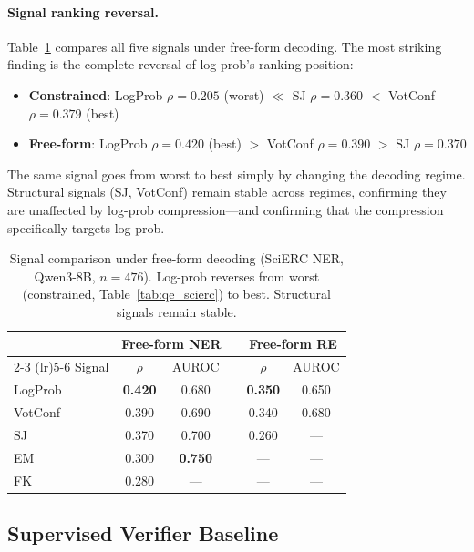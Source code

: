 \documentclass[11pt,a4paper]{article}
\newcommand{\bmark}[1]{\textbf{#1}}
\begin{document}
\paragraph{Signal ranking reversal.}
Table~\ref{tab:freeform_signals} compares all five signals under free-form decoding. The most striking finding is the complete reversal of log-prob's ranking position:
\begin{itemize}
\item \textbf{Constrained}: LogProb $\rho = 0.205$ (worst) $\ll$ SJ $\rho = 0.360$ $<$ VotConf $\rho = 0.379$ (best)
\item \textbf{Free-form}: LogProb $\rho = 0.420$ (best) $>$ VotConf $\rho = 0.390$ $>$ SJ $\rho = 0.370$
\end{itemize}
The same signal goes from worst to best simply by changing the decoding regime. Structural signals (SJ, VotConf) remain stable across regimes, confirming they are unaffected by log-prob compression---and confirming that the compression specifically targets log-prob.

\begin{table}[t]
\centering
\caption{Signal comparison under free-form decoding (SciERC NER, Qwen3-8B, $n = 476$). Log-prob reverses from worst (constrained, Table~\ref{tab:qe_scierc}) to best. Structural signals remain stable.}
\label{tab:freeform_signals}
\small
\begin{tabular}{l cc c cc}
\toprule
& \multicolumn{2}{c}{\textbf{Free-form NER}} & & \multicolumn{2}{c}{\textbf{Free-form RE}} \\
\cmidrule(lr){2-3} \cmidrule(lr){5-6}
Signal & $\rho$ & AUROC & & $\rho$ & AUROC \\
\midrule
LogProb & \bmark{0.420} & 0.680 & & \bmark{0.350} & 0.650 \\
VotConf & 0.390 & 0.690 & & 0.340 & 0.680 \\
SJ      & 0.370 & 0.700 & & 0.260 & --- \\
EM      & 0.300 & \bmark{0.750} & & --- & --- \\
FK      & 0.280 & --- & & --- & --- \\
\bottomrule
\end{tabular}
\end{table}

\subsection{Supervised Verifier Baseline}
\label{sec:verifier}
\end{document}
